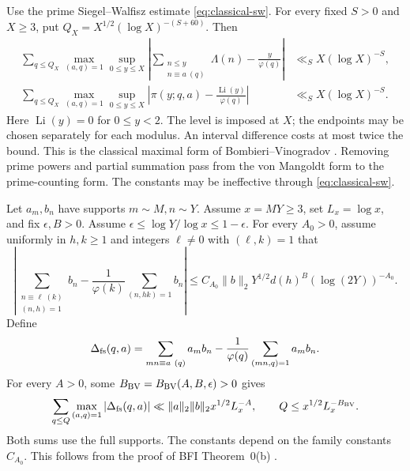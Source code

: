 \begin{fact}\label{fact:prime-estimates-maximal}
Use the prime Siegel--Walfisz estimate \eqref{eq:classical-sw}.
For every fixed $S>0$ and $X\ge3$, put
$Q_X=X^{1/2}(\log X)^{-(S+60)}$. Then
\begin{equation}\label{eq:classical-bv-maximal}
 \begin{aligned}
 \sum_{q\le Q_X}\max_{(a,q)=1}\sup_{0\le y\le X}
 \left|\sum_{\substack{n\le y\\n\equiv a\ (q)}}\Lambda(n)
                -\frac y{\varphi(q)}\right|
 &\ll_S X(\log X)^{-S},\\
 \sum_{q\le Q_X}\max_{(a,q)=1}\sup_{0\le y\le X}
 \left|\pi(y;q,a)-\frac{\operatorname{Li}(y)}{\varphi(q)}\right|
 &\ll_S X(\log X)^{-S}.
 \end{aligned}
\end{equation}
Here $\operatorname{Li}(y)=0$ for $0\le y<2$.
The level is imposed at $X$; the endpoints may be chosen separately for
each modulus. An interval difference costs at most twice the bound.
This is the classical maximal form of Bombieri--Vinogradov
\cite[Chapter~28]{Davenport1980}. Removing prime powers and partial
summation pass from the von Mangoldt form to the prime-counting form.
The constants may be ineffective through \eqref{eq:classical-sw}.
\end{fact}

\begin{fact}\label{fact:bv-full-support}
Let $a_m,b_n$ have supports $m\sim M,n\sim Y$.
Assume $x=MY\ge3$, set $L_x=\log x$, and fix $\epsilon,B>0$.
Assume $\epsilon\le\log Y/\log x\le1-\epsilon$.
For every $A_0>0$, assume uniformly in $h,k\ge1$ and integers
$\ell\ne0$ with $(\ell,k)=1$ that
\begin{equation}\label{eq:bvfs-sw}
 \left|\sum_{\substack{n\equiv\ell\ (k)\\(n,h)=1}}b_n
 -\frac1{\varphi(k)}\sum_{(n,hk)=1}b_n\right|
 \le C_{A_0}\|b\|_2Y^{1/2}d(h)^B(\log(2Y))^{-A_0}.
\end{equation}
Define
\[
 \Delta_{\rm fs}(q,a)=\sum_{mn\equiv a\ (q)}a_mb_n
       -\frac1{\varphi(q)}\sum_{(mn,q)=1}a_mb_n.
\]
For every $A>0$, some $B_{\rm BV}=B_{\rm BV}(A,B,\epsilon)>0$ gives
\begin{equation}\label{eq:bvfs}
 \sum_{q\le Q}\max_{(a,q)=1}|\Delta_{\rm fs}(q,a)|
 \ll \|a\|_2\|b\|_2x^{1/2}L_x^{-A},\qquad
 Q\le x^{1/2}L_x^{-B_{\rm BV}}.
\end{equation}
Both sums use the full supports. The constants depend on the family constants
$C_{A_0}$. This follows from the proof of BFI Theorem~0(b)
\cite[(A1)--(A2), p.~206; Theorem~0(b), (1.5), p.~212;
proof, pp.~213--214]{BFI86}.
\end{fact}

